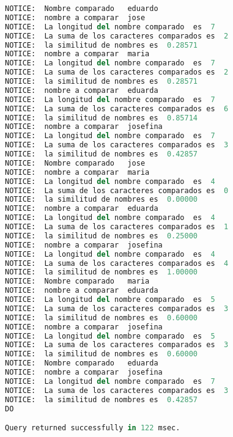 \begin{lstlisting}[language=python]
NOTICE:  Nombre comparado   eduardo
NOTICE:  nombre a comparar  jose
NOTICE:  La longitud del nombre comparado  es  7
NOTICE:  La suma de los caracteres comparados es  2
NOTICE:  la similitud de nombres es  0.28571
NOTICE:  nombre a comparar  maria
NOTICE:  La longitud del nombre comparado  es  7
NOTICE:  La suma de los caracteres comparados es  2
NOTICE:  la similitud de nombres es  0.28571
NOTICE:  nombre a comparar  eduarda
NOTICE:  La longitud del nombre comparado  es  7
NOTICE:  La suma de los caracteres comparados es  6
NOTICE:  la similitud de nombres es  0.85714
NOTICE:  nombre a comparar  josefina
NOTICE:  La longitud del nombre comparado  es  7
NOTICE:  La suma de los caracteres comparados es  3
NOTICE:  la similitud de nombres es  0.42857
NOTICE:  Nombre comparado   jose
NOTICE:  nombre a comparar  maria
NOTICE:  La longitud del nombre comparado  es  4
NOTICE:  La suma de los caracteres comparados es  0
NOTICE:  la similitud de nombres es  0.00000
NOTICE:  nombre a comparar  eduarda
NOTICE:  La longitud del nombre comparado  es  4
NOTICE:  La suma de los caracteres comparados es  1
NOTICE:  la similitud de nombres es  0.25000
NOTICE:  nombre a comparar  josefina
NOTICE:  La longitud del nombre comparado  es  4
NOTICE:  La suma de los caracteres comparados es  4
NOTICE:  la similitud de nombres es  1.00000
NOTICE:  Nombre comparado   maria
NOTICE:  nombre a comparar  eduarda
NOTICE:  La longitud del nombre comparado  es  5
NOTICE:  La suma de los caracteres comparados es  3
NOTICE:  la similitud de nombres es  0.60000
NOTICE:  nombre a comparar  josefina
NOTICE:  La longitud del nombre comparado  es  5
NOTICE:  La suma de los caracteres comparados es  3
NOTICE:  la similitud de nombres es  0.60000
NOTICE:  Nombre comparado   eduarda
NOTICE:  nombre a comparar  josefina
NOTICE:  La longitud del nombre comparado  es  7
NOTICE:  La suma de los caracteres comparados es  3
NOTICE:  la similitud de nombres es  0.42857
DO

Query returned successfully in 122 msec.
\end{lstlisting}





